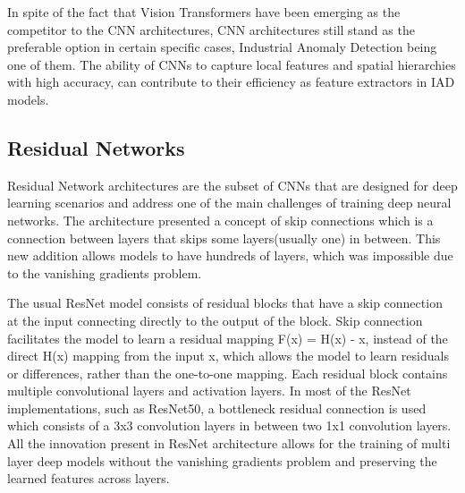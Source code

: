 In spite of the fact that Vision Transformers have been emerging as the competitor to the CNN architectures, CNN architectures still stand as the preferable option in certain specific cases, Industrial Anomaly Detection being one of them. The ability of CNNs to capture local features and spatial hierarchies with high accuracy, can contribute to their efficiency as feature extractors in IAD models.

\subsection{Residual Networks}
\label{resnet}

Residual Network architectures are the subset of CNNs that are designed for deep learning scenarios and address one of the main challenges of training deep neural networks. The architecture presented a concept of skip connections which is a connection between layers that skips some layers(usually one) in between. This new addition allows models to have hundreds of layers, which was impossible due to the vanishing gradients problem.

The usual ResNet model consists of residual blocks that have a skip connection at the input connecting directly to the output of the block. Skip connection facilitates the model to learn a residual mapping F(x) = H(x) - x, instead of the direct H(x) mapping from the input x, which allows the model to learn residuals or differences, rather than the one-to-one mapping. Each residual block contains multiple convolutional layers and activation layers. In most of the ResNet implementations, such as ResNet50, a bottleneck residual connection is used which consists of a 3x3 convolution layers in between two 1x1 convolution layers. All the innovation present in ResNet architecture allows for the training of multi layer deep models without the vanishing gradients problem and preserving the learned features across layers.

